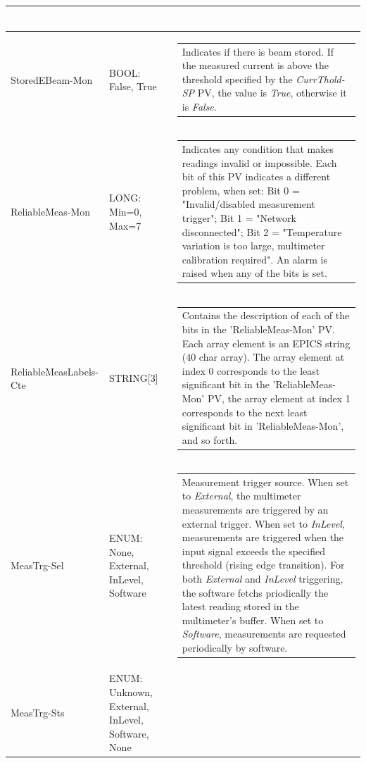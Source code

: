 \documentclass[openany]{article}
\begin{document}
\begin{longtable}{| m{3.0cm} m{4.5cm} m{7.0cm} |}
\begin{tabular}{@{}m{6cm}@{}}
						\end{tabular} \\ \hline
		StoredEBeam-Mon & BOOL: False, True & \begin{tabular}{@{}m{6cm}@{}}
	    					Indicates if there is beam stored. If the measured current is above the threshold specified by the \emph{CurrThold-SP} PV, the value is \emph{True}, otherwise it is \emph{False}.
						\end{tabular} \\ \hline
		ReliableMeas-Mon & LONG: Min=0, Max=7 & \begin{tabular}{@{}m{6cm}@{}}
	    					Indicates any condition that makes readings invalid or impossible. Each bit of this PV indicates a different problem, when set: Bit 0 = "Invalid/disabled measurement trigger"; Bit 1 = "Network disconnected"; Bit 2 = "Temperature variation is too large, multimeter calibration required". An alarm is raised when any of the bits is set.
						\end{tabular} \\ \hline
		ReliableMeasLabels-Cte & STRING[3] & \begin{tabular}{@{}m{6cm}@{}}
	    					Contains the description of each of the bits in the 'ReliableMeas-Mon' PV. Each array element is an EPICS string (40 char array). The array element at index 0 corresponds to the least significant bit in the 'ReliableMeas-Mon' PV, the array element at index 1 corresponds to the next least significant bit in 'ReliableMeas-Mon', and so forth.
						\end{tabular} \\ \hline
		MeasTrg-Sel & ENUM: None, External, InLevel, Software & \begin{tabular}{@{}m{6cm}@{}}
				      	  Measurement trigger source. When set to \emph{External}, the multimeter measurements are triggered by an external trigger. When set to \emph{InLevel}, measurements are triggered when the input signal exceeds the specified threshold (rising edge transition). For both \emph{External} and \emph{InLevel} triggering, the software fetchs priodically the latest reading stored in the multimeter's buffer. When set to \emph{Software}, measurements are requested periodically by software.
					  \end{tabular} \\ \hline
		MeasTrg-Sts & ENUM: Unknown, External, InLevel, Software, None & \begin{tabular}{@{}m{6cm}@{}}

\end{tabular}
\end{longtable}
\end{document}

